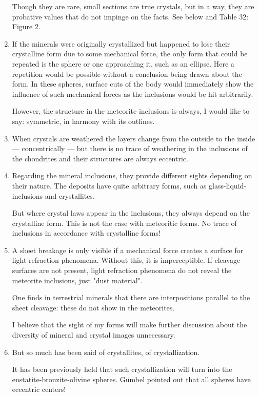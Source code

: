 \documentclass[a4paper, 11pt, oneside]{article}
\begin{document}
\begin{enumerate}
    Though they are rare, small sections are true crystals, but in a way, they are probative values that do not impinge on the facts. See below and Table 32: Figure 2.
    \item If the minerals were originally crystallized but happened to lose their crystalline form due to some mechanical force, the only form that could be repeated is the sphere or one approaching it, such as an ellipse. Here a repetition would be possible without a conclusion being drawn about the form. In these spheres, surface cuts of the body would immediately show the influence of such mechanical forces as the inclusions would be hit arbitrarily.
    
    However, the structure in the meteorite inclusions is always, I would like to say: symmetric, in harmony with its outlines.
    \item When crystals are weathered the layers change from the outside to the inside — concentrically — but there is no trace of weathering in the inclusions of the chondrites and their structures are always eccentric.
    \item Regarding the mineral inclusions, they provide different sights depending on their nature. The deposits have quite arbitrary forms, such as glass-liquid-inclusions and crystallites.
    
    But where crystal laws appear in the inclusions, they always depend on the crystalline form. This is not the case with meteoritic forms. No trace of inclusions in accordance with crystalline forms!
    \item A sheet breakage is only visible if a mechanical force creates a surface for light refraction phenomena. Without this, it is imperceptible. If cleavage surfaces are not present, light refraction phenomena do not reveal the meteorite inclusions, just "dust material".
    
    One finds in terrestrial minerals that there are interpositions parallel to the sheet cleavage: these do not show in the meteorites.
    
    I believe that the sight of my forms will make further discussion about the diversity of mineral and crystal images unnecessary.
    \item But so much has been said of crystallites, of crystallization.
    
    It has been previously held that such crystallization will turn into the enstatite-bronzite-olivine spheres. Gümbel pointed out that all spheres have eccentric centers!
    

\end{enumerate}
\end{document}
